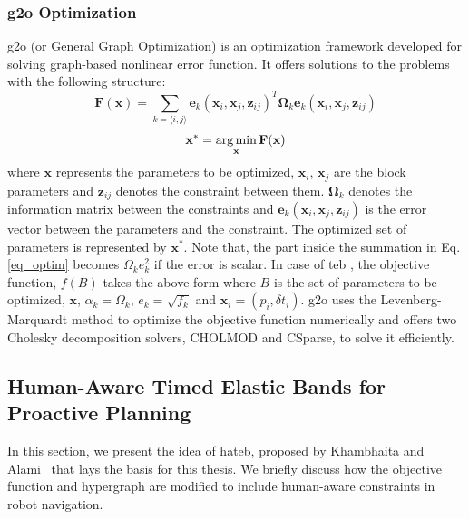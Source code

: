 \subsubsection{g2o Optimization}
g2o (or General Graph Optimization) \cite{grisetti2011g2o} is an optimization framework developed for solving graph-based nonlinear error function. It offers solutions to the problems with the following structure:
\begin{equation}
\label{eq_optim}
  \mathbf{F(x)} = \sum_{k=\langle i,j \rangle} \mathbf{e}_k(\mathbf{x}_i, \mathbf{x}_j, \mathbf{z}_{ij})^T \mathbf{\Omega}_k\mathbf{e}_k(\mathbf{x}_i, \mathbf{x}_j, \mathbf{z}_{ij}) 
\end{equation}
\begin{equation}
    \mathbf{x}^* = \argmin_\mathbf{x} \mathbf{F(x)}
\end{equation}
where $\mathbf{x}$ represents the parameters to be optimized, $\mathbf{x}_i$, $\mathbf{x}_j$ are the block parameters and $\mathbf{z}_{ij}$ denotes the constraint between them. $\mathbf{\Omega}_k$ denotes the information matrix between the constraints and $\mathbf{e}_k(\mathbf{x}_i, \mathbf{x}_j, \mathbf{z}_{ij})$ is the error vector between the parameters and the constraint. The optimized set of parameters is represented by $\mathbf{x}^*$. Note that, the part inside the summation in Eq. \eqref{eq_optim} becomes $\Omega_k e_k^2$ if the error is scalar. In case of \acrshort{teb} \cite{rosmann2013efficient}, the objective function, $f(B)$ takes the above form where $B$ is the set of parameters to be optimized, $\mathbf{x}$, $\alpha_k = \Omega_k$, $e_k = \sqrt{f_k}$ and $\mathbf{x}_i = (p_i, \delta t_i)$. g2o uses the Levenberg-Marquardt method to optimize the objective function numerically and offers two Cholesky decomposition solvers, CHOLMOD and CSparse, to solve it efficiently.

\subsection{Human-Aware Timed Elastic Bands for Proactive Planning}
In this section, we present the idea of \acrfull{hateb}, proposed by Khambhaita and Alami~\cite{khambhaita2017viewing} that lays the basis for this thesis. We briefly discuss how the objective function and hypergraph are modified to include human-aware constraints in robot navigation. 

